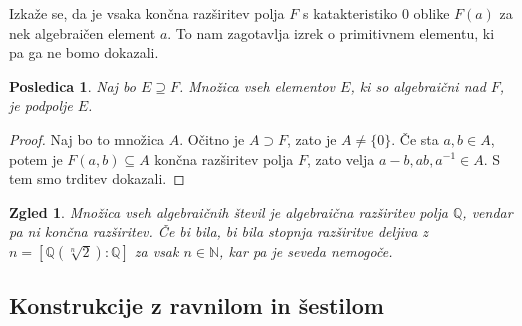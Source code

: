 \documentclass[10pt, a4paper]{article}
\newtheorem{posledica}[izr]{Posledica}
\newtheorem{zgled}{Zgled}[section]
\newenvironment{noticeC}{%
  \tcolorbox[%
  notitle,
  empty,
  enhanced,  %
  breakable,
  coltext=black, 
  fontupper=\rmfamily,
  parbox=false,
  noparskip,
  sharp corners,
  boxrule=-1pt,  %
  frame hidden,
  left=7pt,  %
  right=7pt,
  top=5pt,
  bottom=5pt,
  before skip=2.5ex plus 2pt,
  after skip=2.5ex plus 2pt,
  overlay unbroken and last={%
  },
  ]}
{\endtcolorbox}
\newenvironment{dokaz}%
  {\begin{noticeC}\begin{proof}}%
  {\end{proof}\end{noticeC}}
\newcommand{\N}{\mathbb {N}}
\newcommand{\Q}{\mathbb {Q}}
\begin{document}
Izkaže se, da je vsaka končna razširitev polja $F$ s katakteristiko $0$ oblike $F(a)$
za nek algebraičen element $a$. To nam zagotavlja izrek o primitivnem elementu, ki pa ga ne bomo dokazali.

\begin{posledica}
  Naj bo $E \supseteq F$. Množica vseh elementov $E$, ki so algebraični nad $F$, je podpolje $E$.
\end{posledica}

\begin{dokaz}
  Naj bo to množica $A$. Očitno je $A \supset F$, zato je $A \neq \{0\}$. Če sta $a, b \in A$, potem je 
  $F(a, b) \subseteq A$ končna razširitev polja $F$, zato velja $a -b, ab, a^{-1} \in A$. S tem smo trditev dokazali.
\end{dokaz}

\begin{zgled}
  Množica vseh algebraičnih števil je algebraična razširitev polja $\Q$, vendar pa ni končna razširitev.
  Če bi bila, bi bila stopnja razširitve deljiva z $n = [\Q (\sqrt[n]{2}) : \Q]$ za vsak $n \in \N$,
  kar pa je seveda nemogoče.
\end{zgled}

\subsection{Konstrukcije z ravnilom in šestilom}
\end{document}
